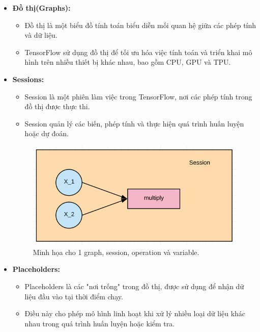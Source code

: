\begin{itemize}
    \item \textbf{Đồ thị(Graphs):}
    \begin{itemize}
        \item Đồ thị là một biểu đồ tính toán biểu diễn mối quan hệ giữa các phép tính và dữ liệu.
        \item TensorFlow sử dụng đồ thị để tối ưu hóa việc tính toán và triển khai mô hình trên nhiều thiết bị khác nhau, bao gồm CPU, GPU và TPU.
    \end{itemize}
    \item \textbf{Sessions:}
    \begin{itemize}
        \item Session là một phiên làm việc trong TensorFlow, nơi các phép tính trong đồ thị được thực thi.
        \item Session quản lý các biến, phép tính và thực hiện quá trình huấn luyện hoặc dự đoán.
    \end{itemize}
    \begin{figure}[H]
        \centering
        \includegraphics[width=\textwidth,height=\textheight,keepaspectratio]{Images/Theoretical basis/083018_0508_WhatisTenso2.png}
        \caption{Minh họa cho 1 graph, session, operation và variable.}
        \label{fig:enter-label}
    \end{figure}
    \item \textbf{Placeholders:} 
    \begin{itemize}
        \item Placeholders là các "nơi trống" trong đồ thị, được sử dụng để nhận dữ liệu đầu vào tại thời điểm chạy.
        \item Điều này cho phép mô hình linh hoạt khi xử lý nhiều loại dữ liệu khác nhau trong quá trình huấn luyện hoặc kiểm tra.
    \end{itemize}
\end{itemize}

